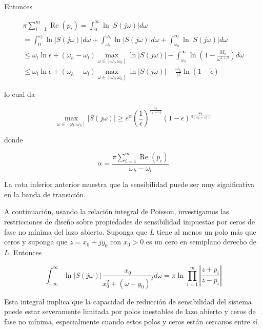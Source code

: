 Entonces

$$
\begin{gathered}
\pi \sum_{i=1}^{m} \operatorname{Re}\left(p_{i}\right)=\int_{0}^{\infty} \ln |S(j \omega)| d \omega \\
=\int_{0}^{\omega_{l}} \ln |S(j \omega)| d \omega+\int_{\omega_{l}}^{\omega_{h}} \ln |S(j \omega)| d \omega+\int_{\omega_{h}}^{\infty} \ln |S(j \omega)| d \omega \\
\leq \omega_{l} \ln \epsilon+\left(\omega_{h}-\omega_{l}\right) \max _{\omega \in\left[\omega_{l}, \omega_{h}\right]} \ln |S(j \omega)|-\int_{\omega_{h}}^{\infty} \ln \left(1-\frac{M_{h}}{\omega^{1+\beta}}\right) d \omega \\
\leq \omega_{l} \ln \epsilon+\left(\omega_{h}-\omega_{l}\right) \max _{\omega \in\left[\omega_{l}, \omega_{h}\right]} \ln |S(j \omega)|-\frac{\omega_{h}}{\beta} \ln (1-\tilde{\epsilon})
\end{gathered}
$$

lo cual da

$$
\max _{\omega \in\left[\omega_{l}, \omega_{h}\right]}|S(j \omega)| \geq e^{\alpha}\left(\frac{1}{\epsilon}\right)^{\frac{\omega_{l}}{\omega_{h}-\omega_{l}}}(1-\tilde{\epsilon})^{\frac{\omega_{h}}{\beta\left(\omega_{h}-\omega_{l}\right)}}
$$

donde

$$
\alpha=\frac{\pi \sum_{i=1}^{m} \operatorname{Re}\left(p_{i}\right)}{\omega_{h}-\omega_{l}}
$$

La cota inferior anterior muestra que la sensibilidad puede ser muy significativa en la banda de transición.

A continuación, usando la relación integral de Poisson, investigamos las restricciones de diseño sobre propiedades de sensibilidad impuestas por ceros de fase no mínima del lazo abierto. Suponga que $L$ tiene al menos un polo más que ceros y suponga que $z=x_{0}+j y_{0}$ con $x_{0}>0$ es un cero en semiplano derecho de $L$. Entonces


\begin{equation*}
\int_{-\infty}^{\infty} \ln |S(j \omega)| \frac{x_{0}}{x_{0}^{2}+\left(\omega-y_{0}\right)^{2}} d \omega=\pi \ln \prod_{i=1}^{m}\left|\frac{z+p_{i}}{z-p_{i}}\right| \tag{6.17}
\end{equation*}


Esta integral implica que la capacidad de reducción de sensibilidad del sistema puede estar severamente limitada por polos inestables de lazo abierto y ceros de fase no mínima, especialmente cuando estos polos y ceros están cercanos entre sí.

